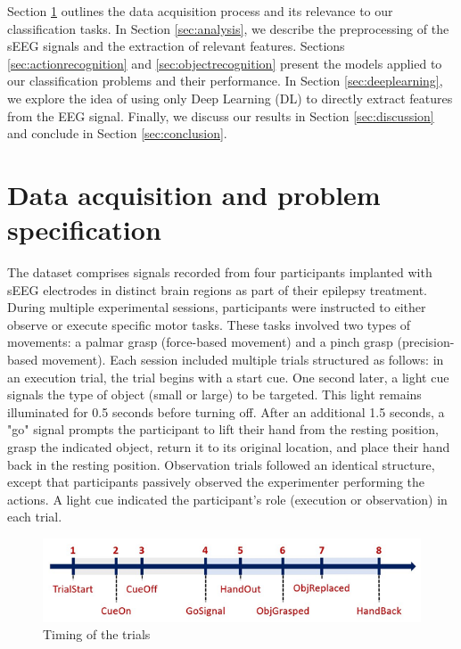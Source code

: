 \documentclass[10pt,conference,compsocconf]{IEEEtran}
\begin{document}
Section \ref{sec:problem} outlines the data acquisition process and its relevance to our classification tasks. In Section \ref{sec:analysis}, we describe the preprocessing of the sEEG signals and the extraction of relevant features. Sections \ref{sec:actionrecognition} and \ref{sec:objectrecognition} present the models applied to our classification problems and their performance. In Section \ref{sec:deeplearning}, we explore the idea of using only Deep Learning (DL) to directly extract features from the EEG signal. Finally, we discuss our results in Section \ref{sec:discussion} and conclude in Section \ref{sec:conclusion}.

\section{Data acquisition and problem specification}
\label{sec:problem}
The dataset comprises signals recorded from four participants implanted with sEEG electrodes in distinct brain regions as part of their epilepsy treatment. During multiple experimental sessions, participants were instructed to either observe or execute specific motor tasks. These tasks involved two types of movements: a palmar grasp (force-based movement) and a pinch grasp (precision-based movement). Each session included multiple trials structured as follows: in an execution trial, the trial begins with a start cue. One second later, a light cue signals the type of object (small or large) to be targeted. This light remains illuminated for 0.5 seconds before turning off. After an additional 1.5 seconds, a "go" signal prompts the participant to lift their hand from the resting position, grasp the indicated object, return it to its original location, and place their hand back in the resting position. Observation trials followed an identical structure, except that participants passively observed the experimenter performing the actions. A light cue indicated the participant's role (execution or observation) in each trial.

\begin{figure}[h!]
  \center
  \includegraphics[width=\linewidth]{images/2024-12-11-13-41-48.png}
  \caption{Timing of the trials}
\end{figure}
\FloatBarrier
\end{document}
